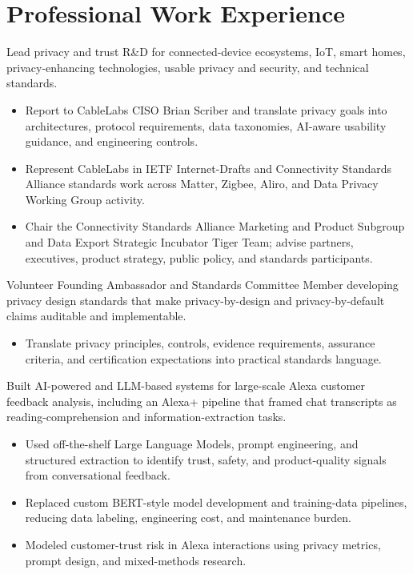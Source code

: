 \documentclass[11pt,letterpaper,sans]{moderncv}        %
\begin{document}
\section{Professional Work Experience}

{Lead privacy and trust R\&D for connected-device ecosystems, IoT, smart homes, privacy-enhancing technologies, usable privacy and security, and technical standards.
\begin{itemize}
    \item Report to CableLabs CISO Brian Scriber and translate privacy goals into architectures, protocol requirements, data taxonomies, AI-aware usability guidance, and engineering controls.
    \item Represent CableLabs in IETF Internet-Drafts and Connectivity Standards Alliance standards work across Matter, Zigbee, Aliro, and Data Privacy Working Group activity.
    \item Chair the Connectivity Standards Alliance Marketing and Product Subgroup and Data Export Strategic Incubator Tiger Team; advise partners, executives, product strategy, public policy, and standards participants.
\end{itemize}}

{Volunteer Founding Ambassador and Standards Committee Member developing privacy design standards that make privacy-by-design and privacy-by-default claims auditable and implementable.
\begin{itemize}
    \item Translate privacy principles, controls, evidence requirements, assurance criteria, and certification expectations into practical standards language.
\end{itemize}}

{Built AI-powered and LLM-based systems for large-scale Alexa customer feedback analysis, including an Alexa+ pipeline that framed chat transcripts as reading-comprehension and information-extraction tasks.
\begin{itemize}
    \item Used off-the-shelf Large Language Models, prompt engineering, and structured extraction to identify trust, safety, and product-quality signals from conversational feedback.
    \item Replaced custom BERT-style model development and training-data pipelines, reducing data labeling, engineering cost, and maintenance burden.
    \item Modeled customer-trust risk in Alexa interactions using privacy metrics, prompt design, and mixed-methods research.
\end{itemize}}
\end{document}
